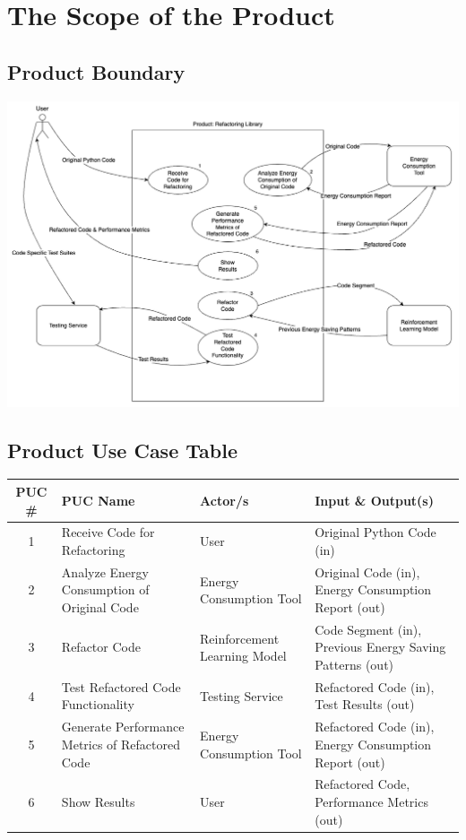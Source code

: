 \documentclass[12pt]{article}
\begin{document}
\section{The Scope of the Product}
\subsection{Product Boundary}
\includegraphics[scale=0.4]{../Images/UseCaseDiagram.png}
\subsection{Product Use Case Table}
\scriptsize
\begin{tabular}{ |c|p{3cm}|p{4cm}|p{5cm}| }
  \hline
  PUC \# & PUC Name & Actor/s & Input \& Output(s) \\
  \hline\hline

  1 & Receive Code for Refactoring & User & Original Python Code (in) \\ \hline
  2 & Analyze Energy Consumption of Original Code & Energy Consumption Tool & Original Code (in), Energy Consumption Report (out) \\ \hline
  3 & Refactor Code & Reinforcement Learning Model & Code Segment (in), Previous Energy Saving Patterns (out) \\ \hline
  4 & Test Refactored Code Functionality & Testing Service & Refactored Code (in), Test Results (out) \\ \hline
  5 & Generate Performance Metrics of Refactored Code & Energy Consumption Tool & Refactored Code (in), Energy Consumption Report (out) \\ \hline
  6 & Show Results & User & Refactored Code, Performance Metrics (out) \\

  \hline
\end{tabular}
\end{document}
